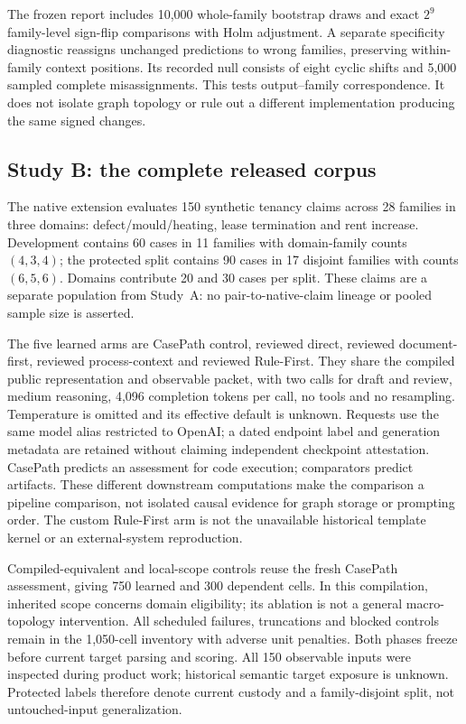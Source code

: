 The frozen report includes 10,000 whole-family bootstrap draws and exact
$2^9$ family-level sign-flip comparisons with Holm adjustment. A separate
specificity diagnostic reassigns unchanged predictions to wrong families,
preserving within-family context positions. Its recorded null consists of
eight cyclic shifts and 5,000 sampled complete misassignments. This tests
output--family correspondence. It does not isolate graph topology or rule
out a different implementation producing the same signed changes.

\subsection{Study B: the complete released corpus}

The native extension evaluates 150 synthetic tenancy claims across 28
families in three domains: defect/mould/heating, lease termination and rent
increase. Development contains 60 cases in 11 families with domain-family
counts $(4,3,4)$; the protected split contains 90 cases in 17 disjoint
families with counts $(6,5,6)$. Domains contribute 20 and 30 cases per split.
These claims are a separate population from Study~A: no pair-to-native-claim
lineage or pooled sample size is asserted.

The five learned arms are CasePath control, reviewed direct, reviewed
document-first, reviewed process-context and reviewed Rule-First. They
share the compiled public representation and observable packet, with two
calls for draft and review, medium reasoning, 4,096 completion tokens per
call, no tools and no resampling. Temperature is omitted and its effective
default is unknown. Requests use the same model alias restricted to OpenAI;
a dated endpoint label and generation metadata are retained without claiming
independent checkpoint attestation. CasePath predicts an assessment for
code execution; comparators predict artifacts. These different downstream
computations make the comparison a pipeline comparison, not isolated
causal evidence for graph storage or prompting order. The custom Rule-First
arm is not the unavailable historical template kernel or an external-system
reproduction.

Compiled-equivalent and local-scope controls reuse the fresh CasePath
assessment, giving 750 learned and 300 dependent cells. In this compilation,
inherited scope concerns domain eligibility; its ablation is not a general
macro-topology intervention. All scheduled failures, truncations and blocked
controls remain in the 1,050-cell inventory with adverse unit penalties.
Both phases freeze before current target parsing and scoring. All 150
observable inputs were inspected during product work; historical semantic
target exposure is unknown. Protected labels therefore denote current
custody and a family-disjoint split, not untouched-input generalization.

